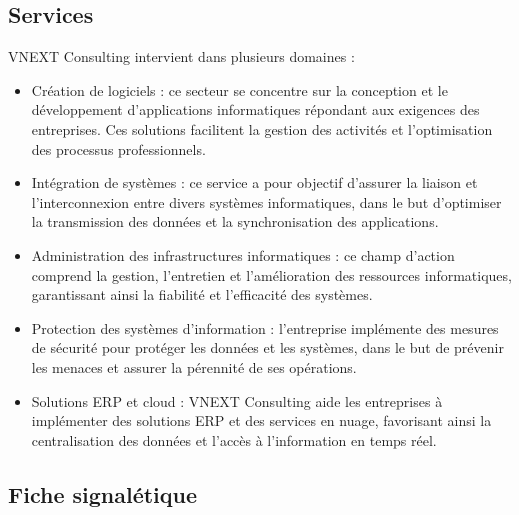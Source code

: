 \subsection{Services}
VNEXT Consulting intervient dans plusieurs domaines :
\begin{itemize}[label=—]
    \item Création de logiciels : ce secteur se concentre sur la conception et le développement d'applications informatiques répondant aux exigences des entreprises. Ces solutions facilitent la gestion des activités et l'optimisation des processus professionnels.

    \item Intégration de systèmes : ce service a pour objectif d'assurer la liaison et l'interconnexion entre divers systèmes informatiques, dans le but d'optimiser la transmission des données et la synchronisation des applications.

    \item Administration des infrastructures informatiques : ce champ d'action comprend la gestion, l'entretien et l'amélioration des ressources informatiques, garantissant ainsi la fiabilité et l'efficacité des systèmes.

    \item Protection des systèmes d'information : l'entreprise implémente des mesures de sécurité pour protéger les données et les systèmes, dans le but de prévenir les menaces et assurer la pérennité de ses opérations.

    \item Solutions ERP et cloud : VNEXT Consulting aide les entreprises à implémenter des solutions ERP et des services en nuage, favorisant ainsi la centralisation des données et l'accès à l'information en temps réel.
\end{itemize}

\subsection{Fiche signalétique}

